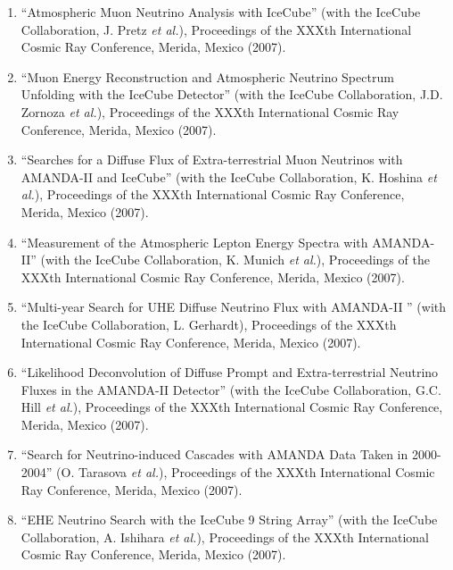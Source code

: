 \begin{enumerate}
\item ``Atmospheric Muon Neutrino Analysis with IceCube''
        (with the   IceCube Collaboration, J. Pretz {\it et
        al.}), Proceedings of the XXXth   International
        Cosmic Ray Conference, Merida, Mexico (2007).

\item ``Muon Energy Reconstruction and Atmospheric Neutrino
        Spectrum   Unfolding with the IceCube Detector''
        (with the IceCube Collaboration,   J.D. Zornoza {\it
        et al.}), Proceedings of the XXXth International
        Cosmic   Ray Conference, Merida, Mexico (2007).

\item ``Searches for a Diffuse Flux of Extra-terrestrial
        Muon Neutrinos   with AMANDA-II and IceCube'' (with
        the IceCube Collaboration,   K. Hoshina {\it et
        al.}), Proceedings of the XXXth International Cosmic
        Ray Conference, Merida, Mexico (2007).

\item ``Measurement of the Atmospheric Lepton Energy Spectra
        with   AMANDA-II'' (with the IceCube Collaboration,
        K. Munich {\it et al.}),   Proceedings of the XXXth
        International Cosmic Ray Conference,   Merida,
        Mexico (2007).

\item ``Multi-year Search for UHE Diffuse Neutrino Flux with
        AMANDA-II  '' (with the IceCube Collaboration, L.
        Gerhardt), Proceedings of the   XXXth International
        Cosmic Ray Conference, Merida, Mexico (2007).

\item ``Likelihood Deconvolution of Diffuse Prompt and
        Extra-terrestrial   Neutrino Fluxes in the AMANDA-II
        Detector'' (with the IceCube   Collaboration, G.C.
        Hill {\it et al.}), Proceedings of the XXXth
        International Cosmic Ray Conference, Merida, Mexico
        (2007).

\item ``Search for Neutrino-induced Cascades with AMANDA
        Data Taken in   2000-2004'' (O. Tarasova {\it et
        al.}), Proceedings of the XXXth   International
        Cosmic Ray Conference, Merida, Mexico (2007).

\item ``EHE Neutrino Search with the IceCube 9 String
        Array'' (with the   IceCube Collaboration, A.
        Ishihara {\it et al.}), Proceedings of the XXXth
        International Cosmic Ray Conference, Merida, Mexico
        (2007).


\end{enumerate}
